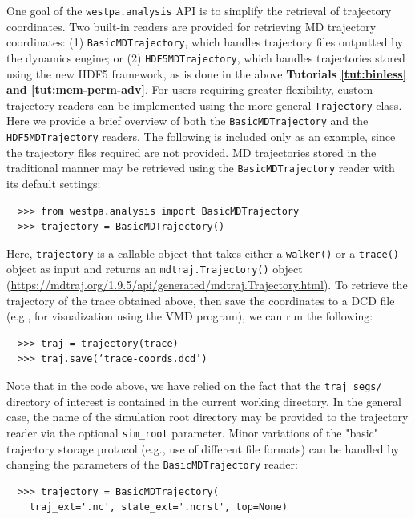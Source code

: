 One goal of the \verb|westpa.analysis| API is to simplify the retrieval of trajectory coordinates.
Two built-in readers are provided for retrieving MD trajectory coordinates: (1) \verb|BasicMDTrajectory|, which handles trajectory files outputted by the dynamics engine; or (2) \verb|HDF5MDTrajectory|, which handles trajectories stored using the new HDF5 framework, as is done in the above \textbf{Tutorials \ref{tut:binless} and \ref{tut:mem-perm-adv}}.
For users requiring greater flexibility, custom trajectory readers can be implemented using the more general \verb|Trajectory| class.
Here we provide a brief overview of both the \verb|BasicMDTrajectory| and the \verb|HDF5MDTrajectory| readers.
The following is included only as an example, since the trajectory files required are not provided.
MD trajectories stored in the traditional manner may be retrieved using the \verb|BasicMDTrajectory| reader with its default settings:

\begin{verbatim}
  >>> from westpa.analysis import BasicMDTrajectory
  >>> trajectory = BasicMDTrajectory()
\end{verbatim}

Here, \verb|trajectory| is a callable object that takes either a \verb|walker()| or a \verb|trace()| object as input and returns an \verb|mdtraj.Trajectory()| object ({\url{https://mdtraj.org/1.9.5/api/generated/mdtraj.Trajectory.html}}).
To retrieve the trajectory of the trace obtained above, then save the coordinates to a DCD file (e.g., for visualization using the VMD program), we can run the following:

\begin{verbatim}
  >>> traj = trajectory(trace)
  >>> traj.save(‘trace-coords.dcd’)
\end{verbatim}

Note that in the code above, we have relied on the fact that the \verb|traj_segs/| directory of interest is contained in the current working directory.
In the general case, the name of the simulation root directory may be provided to the trajectory reader via the optional \verb|sim_root| parameter.
Minor variations of the "basic" trajectory storage protocol (e.g., use of different file formats) can be handled by changing the parameters of the \verb|BasicMDTrajectory| reader: 

\begin{verbatim}
  >>> trajectory = BasicMDTrajectory(
    traj_ext='.nc', state_ext='.ncrst', top=None)
\end{verbatim}

